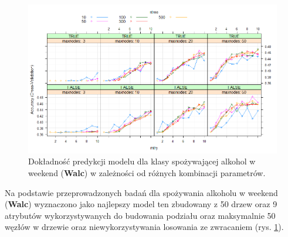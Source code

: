 \begin{figure}[h]
     \centering 
     \includegraphics[scale=0.60]{tex/customW_vol4.png}
     \caption{Dokładność predykcji modelu dla klasy spożywającej alkohol w weekend (\textbf{Walc}) w zależności od różnych kombinacji parametrów.}
     \label{fig:all_Walc}
\end{figure}



Na podstawie przeprowadzonych badań dla spożywania alkoholu w weekend (\textbf{Walc}) wyznaczono jako najlepszy model ten zbudowany z 50 drzew oraz 9 atrybutów wykorzystywanych do  budowania podziału oraz maksymalnie 50 węzłów w drzewie oraz niewykorzystywania losowania ze zwracaniem (rys. \ref{fig:all_Walc}).
 
